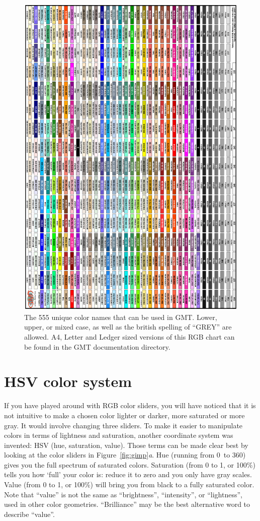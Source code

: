 \begin{figure}
   \includegraphics[width=\textwidth]{scripts/GMT_RGBchart_a4}
   \caption{The 555 unique color names that can be used in GMT. Lower, upper, or mixed case, as well as the british
   spelling of ``GREY'' are allowed. A4, Letter and Ledger sized versions of this RGB chart can be found in the
   GMT documentation directory.}
   \label{fig:RGBchart}
\end{figure}

\section{HSV color system}
If you have played around with RGB color sliders, you will have noticed that it is not intuitive to make a chosen color lighter or darker, more saturated or more gray. It would involve changing three sliders. To make it easier to manipulate colors in terms of lightness and saturation, another coordinate system was invented: HSV (hue, saturation, value). Those terms can be made clear best by looking at the color sliders in Figure~\ref{fig:gimp}\emph{a}. Hue (running from 0\DS\ to 360\DS) gives you the full spectrum of saturated colors. Saturation (from 0 to 1, or 100\%) tells you how `full' your color is: reduce it to zero and you only have gray scales. Value (from 0 to 1, or 100\%) will bring you from black to a fully saturated color. Note that ``value'' is not the same as ``brightness'', ``intensity'', or ``lightness'', used in other color geometries. ``Brilliance'' may be the best alternative word to describe ``value''.


